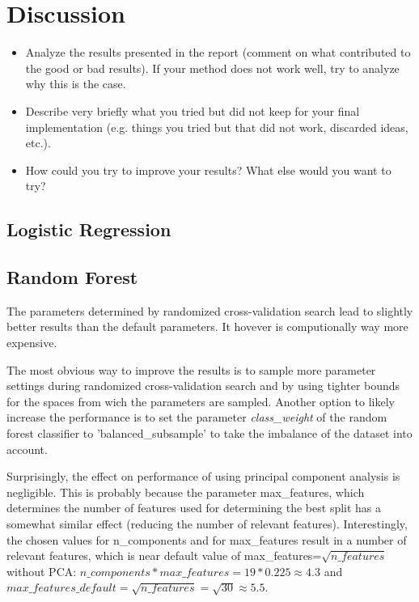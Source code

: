 \documentclass[a4, 10 pt, conference]{ieeeconf}  %
\begin{document}
\section{Discussion}
\label{sec:discuss}

{\color{blue}
\begin{itemize}
	\item Analyze the results presented in the report (comment on what contributed to the good or bad results). If your method does not work well, try to analyze why this is the case.
	\item Describe very briefly what you tried but did not keep for your final implementation (e.g. things you tried but that did not work, discarded ideas, etc.).
	\item How could you try to improve your results? What else would you want to try?

\end{itemize}
}
\subsection{Logistic Regression}
\subsection{Random Forest}
The parameters determined by randomized cross-validation search lead to slightly better results than the default parameters. It hovever is computionally way more expensive.

The most obvious way to improve the results is to sample more parameter settings during randomized cross-validation search and by using tighter bounds for the spaces from wich the parameters are sampled. Another option to likely increase the performance is to set the parameter \emph{class\_weight} of the random forest classifier to 'balanced\_subsample' to take the imbalance of the dataset into account.

Surprisingly, the effect on performance of using principal component analysis is negligible. This is probably because the parameter max\_features, which determines the number of features used for determining the best split has a somewhat similar effect (reducing the number of relevant features). Interestingly, the chosen values for n\_components and for max\_features result in a number of relevant features, which is near default value of max\_features=$\sqrt{n\_features}$ without PCA: $n\_components*max\_features = 19*0.225 \approx 4.3$ and $max\_features\_default=\sqrt{n\_features}=\sqrt{30}\approx 5.5$.
\end{document}
